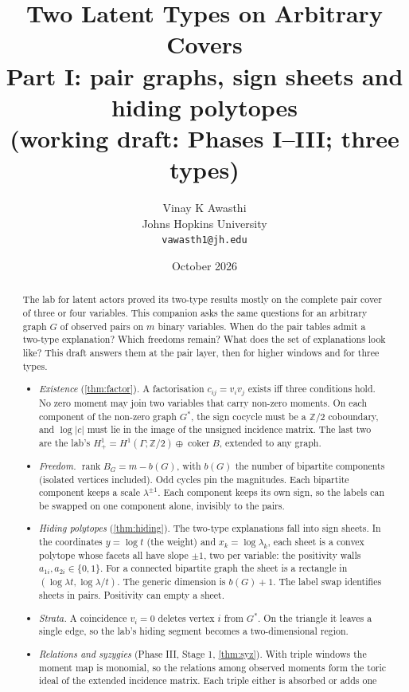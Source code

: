 \documentclass[11pt]{article}
\title{Two Latent Types on Arbitrary Covers\\[2pt]\large Part I: pair graphs, sign sheets and hiding polytopes\\ \normalsize (working draft: Phases I--III; three types)}
\author{Vinay K Awasthi\\ Johns Hopkins University\\ \texttt{vawasth1@jh.edu}}
\date{October 2026}
\theoremstyle{definition}\newtheorem{definition}[theorem]{Definition}\newtheorem{remark}[theorem]{Remark}\newtheorem{example}[theorem]{Example}
\begin{document}
\maketitle

\begin{abstract}
The lab for latent actors \cite{Lab} proved its two-type results mostly on the complete pair cover of three or four variables. This
companion asks the same questions for an arbitrary graph $G$ of observed pairs on $m$ binary variables. When do the pair tables admit a
two-type explanation? Which freedoms remain? What does the set of explanations look like? This draft answers them at the pair layer, then for higher windows and for three types.
\begin{itemize}
\item \emph{Existence} (\cref{thm:factor}). A factorisation $c_{ij}=v_iv_j$ exists iff three conditions hold. No zero moment may join
  two variables that carry non-zero moments. On each component of the non-zero graph $G^*$, the sign cocycle must be a $\mathbb Z/2$
  coboundary, and $\log|c|$ must lie in the image of the unsigned incidence matrix. The last two are the lab's $H^1_+=H^1(\Gamma;\mathbb
  Z/2)\oplus\operatorname{coker}B$, extended to any graph.
\item \emph{Freedom.} $\operatorname{rank}B_G=m-b(G)$, with $b(G)$ the number of bipartite components (isolated vertices included).
  Odd cycles pin the magnitudes. Each bipartite component keeps a scale $\lambda^{\pm1}$. Each component keeps its own sign, so the
  labels can be swapped on one component alone, invisibly to the pairs.
\item \emph{Hiding polytopes} (\cref{thm:hiding}). The two-type explanations fall into sign sheets. In the coordinates $y=\log t$ (the
  weight) and $x_k=\log\lambda_k$, each sheet is a convex polytope whose facets all have slope $\pm1$, two per variable: the positivity
  walls $a_{1i},a_{2i}\in\{0,1\}$. For a connected bipartite graph the sheet is a rectangle in $(\log\lambda t,\log\lambda/t)$. The
  generic dimension is $b(G)+1$. The label swap identifies sheets in pairs. Positivity can empty a sheet.
\item \emph{Strata.} A coincidence $v_i=0$ deletes vertex $i$ from $G^*$. On the triangle it leaves a single edge, so the lab's hiding
  segment becomes a two-dimensional region.
\item \emph{Relations and syzygies} (Phase III, Stage 1, \cref{thm:syz}). With triple windows the moment map is monomial, so the
  relations among observed moments form the toric ideal of the extended incidence matrix. Each triple either is absorbed or adds one

\end{itemize}
\end{abstract}
\end{document}
